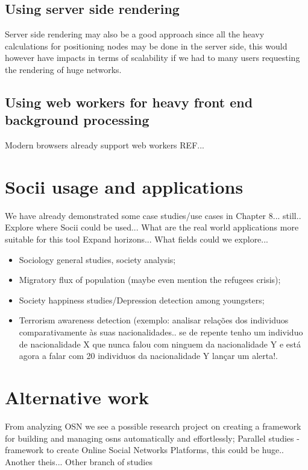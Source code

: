 \subsection{Using server side rendering}
Server side rendering may also be a good approach since all the heavy calculations for positioning nodes
may be done in the server side, this would however have impacts in terms of scalability if we had to many users requesting
the rendering of huge networks.

\subsection{Using web workers for heavy front end background processing}
Modern browsers already support web workers REF...

\section{Socii usage and applications}
We have already demonstrated some case studies/use cases in Chapter 8... still..
Explore where Socii could be used... What are the real world applications more suitable for this tool
Expand horizons... What fields could we explore...\\
\begin{itemize}
    \item Sociology general studies, society analysis;
    \item Migratory flux of population (maybe even mention the refugees crisis);
    \item Society happiness studies/Depression detection among youngsters;
    \item Terrorism awareness detection (exemplo: analisar relações dos individuos comparativamente às suas nacionalidades.. se
    de repente tenho um individuo de nacionalidade X que nunca falou com ninguem da nacionalidade Y e está agora a falar com 20 individuos da nacionalidade Y lançar um alerta!.
\end{itemize}

\section{Alternative work}
From analyzing OSN we see a possible research project on creating a framework for building
and managing \glspl{osn} automatically and effortlessly;
Parallel studies - framework to create Online Social Networks Platforms, this could be huge.. Another theis... Other branch of studies

